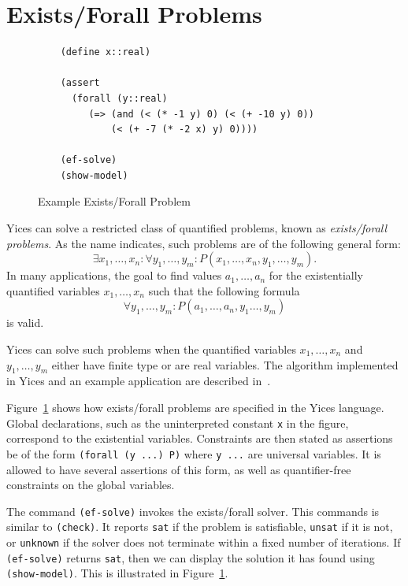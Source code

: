\documentclass[11pt,twoside,fleqn,openright,titlepage]{cslreport}
\begin{document}
\section{Exists/Forall Problems}

\begin{figure}
\begin{footnotesize}
\begin{verbatim}
    (define x::real)

    (assert
      (forall (y::real)
         (=> (and (< (* -1 y) 0) (< (+ -10 y) 0))
             (< (+ -7 (* -2 x) y) 0))))

    (ef-solve)
    (show-model)
\end{verbatim}
\end{footnotesize}
\caption{Example Exists/Forall Problem}
\label{example:ef}
\end{figure}

Yices can solve a restricted class of quantified problems, known as
\emph{exists/forall problems\/}. As the name indicates, such
problems are of the following general form:
$$\exists x_1,\ldots,x_n:\forall
y_1,\ldots,y_m: P(x_1,\ldots,x_n,y_1,\ldots,y_m).$$ In many
applications, the goal to find values $a_1,\ldots,a_n$ for the
existentially quantified variables $x_1,\ldots,x_n$ such that the
following formula $$\forall
y_1,\ldots,y_m: P(a_1,\ldots,a_n,y_1\ldots,y_m)$$ is valid.

\medskip\noindent
Yices can solve such problems when the quantified variables
$x_1,\ldots,x_n$ and $y_1,\ldots,y_m$ either have finite type or are
real variables. The algorithm implemented in Yices and an example
application are described in~\cite{Gascon+etal:fmcad2014}.

\medskip\noindent Figure~\ref{example:ef} shows how exists/forall
problems are specified in the Yices language. Global declarations,
such as the uninterpreted constant \texttt{x} in the figure,
correspond to the existential variables.  Constraints are then stated
as assertions be of the form \texttt{(forall (y ...) P)} where
\texttt{y ...} are universal variables. It is allowed to have several
assertions of this form, as well as quantifier-free constraints on the
global variables.

\medskip\noindent
The command \texttt{(ef-solve)} invokes the exists/forall solver. This
commands is similar to \texttt{(check)}. It reports \texttt{sat} if
the problem is satisfiable, \texttt{unsat} if it is not, or
\texttt{unknown} if the solver does not terminate within a fixed
number of iterations. If \texttt{(ef-solve)} returns \texttt{sat},
then we can display the solution it has found using \texttt{(show-model)}.
This is illustrated in Figure~\ref{example:ef}.
\end{document}
